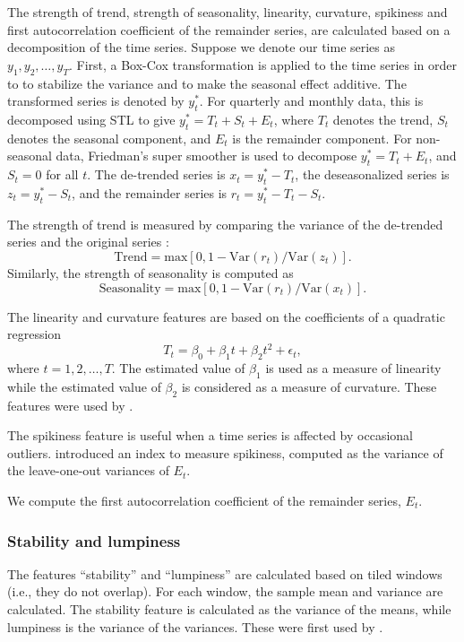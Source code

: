\documentclass[11pt,a4paper,]{article}
\def\var{\text{Var}}
\theoremstyle{definition}
\theoremstyle{definition}
\theoremstyle{definition}
\theoremstyle{remark}
\begin{document}
The strength of trend, strength of seasonality, linearity, curvature,
spikiness and first autocorrelation coefficient of the remainder series,
are calculated based on a decomposition of the time series. Suppose we
denote our time series as \(y_1, y_2, \dots,y_T\). First, a Box-Cox
transformation is applied to the time series in order to to stabilize
the variance and to make the seasonal effect additive. The transformed
series is denoted by \(y_{t}^*\). For quarterly and monthly data, this
is decomposed using STL \autocite{cleveland1990stl} to give
\(y_t^*=T_t+S_t+E_t\), where \(T_t\) denotes the trend, \(S_t\) denotes
the seasonal component, and \(E_t\) is the remainder component. For
non-seasonal data, Friedman's super smoother \autocite{supsmu} is used
to decompose \(y_t^*=T_t+E_t\), and \(S_t=0\) for all \(t\). The
de-trended series is \(x_t=y_t^*-T_t\), the deseasonalized series is
\(z_t=y_t^*-S_t\), and the remainder series is \(r_t=y_t^*-T_t-S_t\).

The strength of trend is measured by comparing the variance of the
de-trended series and the original series \autocite{wang2009rule}: \[
    \text{Trend} = \text{max}\left[0, 1 - \var(r_{t})/\var(z_{t})\right].
\] Similarly, the strength of seasonality is computed as \[
    \text{Seasonality} = \text{max}\left[0, 1- \var(r_{t})/ \var(x_{t})\right].
\]

The linearity and curvature features are based on the coefficients of a
quadratic regression \[
  T_t=\beta_0+\beta_1 t + \beta_2t^2+\epsilon_t,
\] where \(t=1, 2, \dots,T\). The estimated value of \(\beta_1\) is used
as a measure of linearity while the estimated value of \(\beta_2\) is
considered as a measure of curvature. These features were used by
\textcite{hyndman2015large}.

The spikiness feature is useful when a time series is affected by
occasional outliers. \textcite{hyndman2015large} introduced an index to
measure spikiness, computed as the variance of the leave-one-out
variances of \(E_t\).

We compute the first autocorrelation coefficient of the remainder
series, \(E_t\).

\hypertarget{stability-and-lumpiness}{%
\subsubsection*{Stability and lumpiness}\label{stability-and-lumpiness}}

The features ``stability'' and ``lumpiness'' are calculated based on
tiled windows (i.e., they do not overlap). For each window, the sample
mean and variance are calculated. The stability feature is calculated as
the variance of the means, while lumpiness is the variance of the
variances. These were first used by \textcite{hyndman2015large}.
\end{document}
